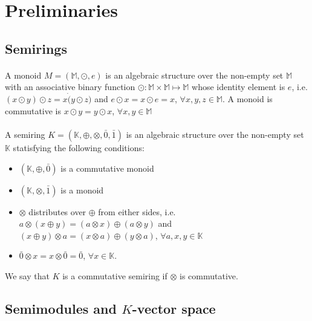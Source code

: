 \section{Preliminaries}

\subsection{Semirings}

\paragraph{} A monoid \cite{Golan1999_1} $M = (\mathbb{M}, \odot, e)$ is an algebraic structure over the non-empty set $\mathbb{M}$ with an associative binary function $\odot : \mathbb{M} \times \mathbb{M} \mapsto \mathbb{M}$ whose identity element is $e$, i.e. $(x \odot y) \odot z = x \dot (y \odot z)$ and $e \odot x = x \odot e = x$, $\forall x, y, z \in \mathbb{M}$.  A monoid is commutative is $x \odot y = y \odot x$, $\forall x, y \in \mathbb{M}$

\paragraph{} A semiring \cite{Golan1999_1} $K = (\mathbb{K}, \oplus, \otimes, \bar{0}, \bar{1})$ is an algebraic structure over the non-empty set $\mathbb{K}$ statisfying the following conditions:
\begin{itemize}
    \item $(\mathbb{K}, \oplus, \bar{0})$ is a commutative monoid
    \item $(\mathbb{K}, \otimes, \bar{1})$ is a monoid
    \item $\otimes$ distributes over $\oplus$ from either sides, i.e. $a \otimes (x \oplus y) = (a \otimes x) \oplus (a \otimes y)$ and $(x \oplus y) \otimes a = (x \otimes a) \oplus (y \otimes a)$, $\forall a, x, y \in \mathbb{K}$
    \item $\bar{0} \otimes x = x \otimes \bar{0} = \bar{0}$, $\forall x \in \mathbb{K}$.
\end{itemize}
We say that $K$ is a commutative semiring if $\otimes$ is commutative.

\subsection{Semimodules and $K$-vector space}

